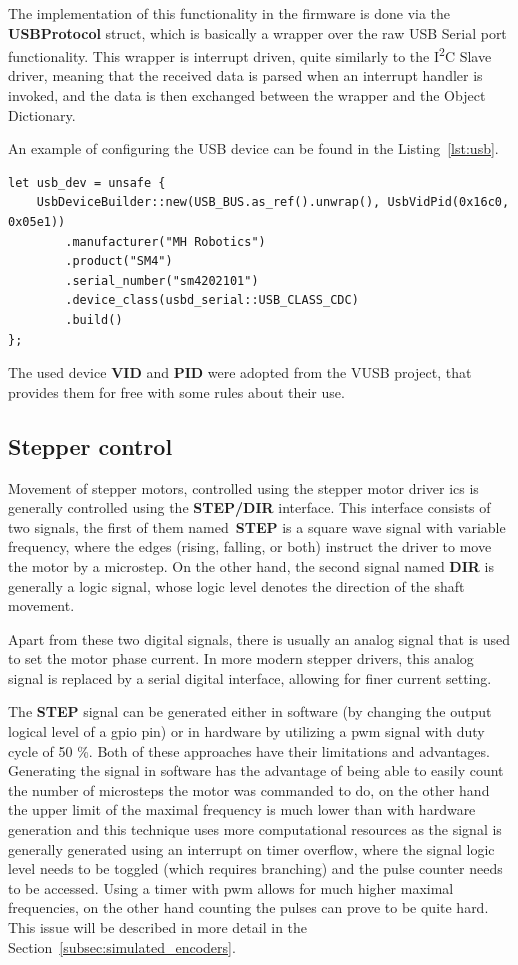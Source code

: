 The implementation of this functionality in the firmware is done via the \textbf{USBProtocol} struct, which is basically a wrapper over the raw USB Serial port functionality.
This wrapper is interrupt driven, quite similarly to the I\textsuperscript{2}C Slave driver, meaning that the received data is parsed when an interrupt handler is invoked, and the data is then exchanged between the wrapper and the Object Dictionary.

An example of configuring the \acs{USB} device can be found in the Listing~\ref{lst:usb}.
\begin{lstlisting}[caption={Initializing the USB device with the CDC-ACM class.},label=lst:usb]
let usb_dev = unsafe {
    UsbDeviceBuilder::new(USB_BUS.as_ref().unwrap(), UsbVidPid(0x16c0, 0x05e1))
        .manufacturer("MH Robotics")
        .product("SM4")
        .serial_number("sm4202101")
        .device_class(usbd_serial::USB_CLASS_CDC)
        .build()
};
\end{lstlisting}
The used device \textbf{VID} and \textbf{PID} were adopted from the VUSB project\cite{noauthor_obdevv-usb_nodate}, that provides them for free with some rules about their use.

\subsection{Stepper control}
\label{subsec:stepper_control}
Movement of stepper motors, controlled using the stepper motor driver \acs{ic}s is generally controlled using the \textbf{STEP/DIR} interface.
This interface consists of two signals, the first of them named~\textbf{STEP} is a square wave signal with variable frequency, where the edges (rising, falling, or both) instruct the driver to move the motor by a microstep.
On the other hand, the second signal named \textbf{DIR} is generally a logic signal, whose logic level denotes the direction of the shaft movement.

Apart from these two digital signals, there is usually an analog signal that is used to set the motor phase current.
In more modern stepper drivers, this analog signal is replaced by a serial digital interface, allowing for finer current setting.

The \textbf{STEP} signal can be generated either in software (by changing the output logical level of a \acs{gpio} pin) or in hardware by utilizing a \acs{pwm} signal with duty cycle of 50 \%.
Both of these approaches have their limitations and advantages.
Generating the signal in software has the advantage of being able to easily count the number of microsteps the motor was commanded to do, on the other hand the upper limit of the maximal frequency is much lower than with hardware generation and this technique uses more computational resources as the signal is generally generated using an interrupt on timer overflow, where the signal logic level needs to be toggled (which requires branching) and the pulse counter needs to be accessed.
Using a timer with \acs{pwm} allows for much higher maximal frequencies, on the other hand counting the pulses can prove to be quite hard.
This issue will be described in more detail in the Section~\ref{subsec:simulated_encoders}.

